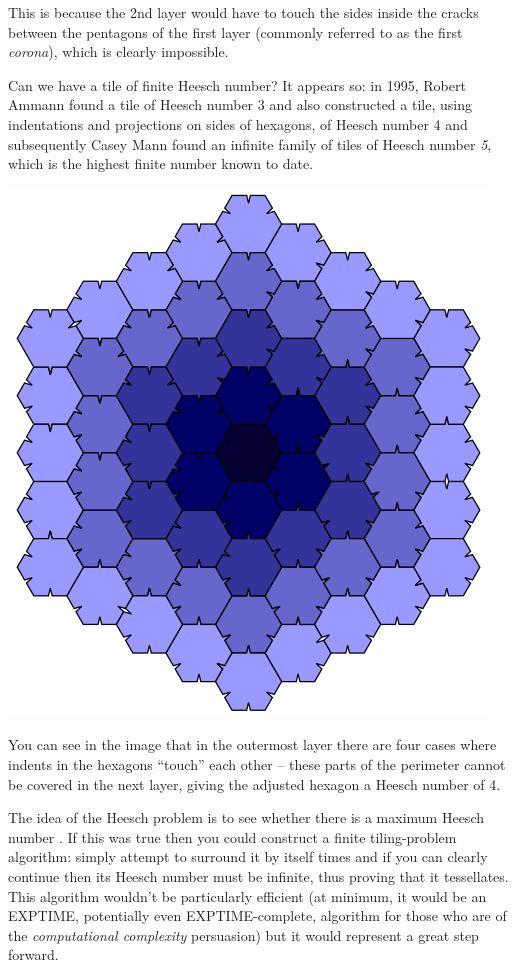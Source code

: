 \documentclass[1opt,a4paper]{article}
\begin{document}
\begin{multicols}{2}
This is because the 2nd layer would have to touch the sides inside the
cracks between the pentagons of the first layer (commonly referred to as
the first \emph{corona}), which is clearly impossible.

Can we have a tile of finite Heesch number? It appears so: in 1995,
Robert Ammann found a tile of Heesch number 3 and also constructed a
tile, using indentations and projections on sides of hexagons, of Heesch
number 4 and subsequently Casey Mann found an infinite family of tiles
of Heesch number \emph{5}, which is the highest finite number known to
date.

\includegraphics[width=\linewidth]{image_9.png}

You can see in the image that in the outermost layer there are four
cases where indents in the hexagons ``touch'' each other -- these parts
of the perimeter cannot be covered in the next layer, giving the
adjusted hexagon a Heesch number of 4.

The idea of the Heesch problem is to see whether there is a maximum
Heesch number . If this was true then you could construct a finite
tiling-problem algorithm: simply attempt to surround it by itself times
and if you can clearly continue then its Heesch number must be infinite,
thus proving that it tessellates. This algorithm wouldn't be
particularly efficient (at minimum, it would be an EXPTIME, potentially
even EXPTIME-complete, algorithm for those who are of the
\emph{computational complexity} persuasion) but it would represent a
great step forward.


\end{multicols}
\end{document}

